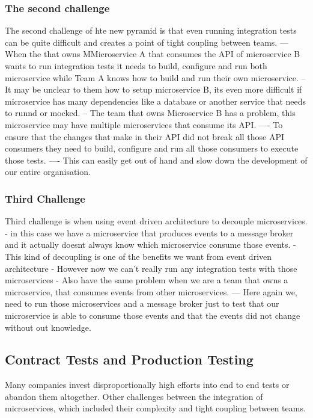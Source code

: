 \documentclass[a4paper, 11pt]{book}
\begin{document}
    \subsubsection{The second challenge}
    The second challenge of hte new pyramid is that even running integration tests can be quite difficult and creates a point of tight coupling between teams.
    --- When the that owns MMicroservice A that consumes the API of microservice B wants to run integration tests it needs to build, configure and run both microservice while Team A knows how to build and run their own microservice.
    -- It may be unclear to them how to setup microservice B, its even more difficult if microservice has many dependencies like a database or another service that needs to runnd or mocked.
    -- The team that owns Microservice B has a problem, this microservice may have multiple microservices that consume its API.
    ---- To ensure that the changes that make in their API did not break all those API consumers they need to build, configure and run all those consumers to execute those tests.
    ---- This can easily get out of hand and slow down the development of our entire organisation.

    \subsubsection{Third Challenge}
    Third challenge is when using event driven architecture to decouple microservices.
    - in this case we have a microservice that produces events to a message broker and it actually doesnt always know which microservice consume those events.
    - This kind of decoupling is one of the benefits we want from event driven architecture
    - However now we can't really run any integration tests with those microservices
    - Also have the same problem when we are a team that owns a microservice, that consumes events from other microservices.
    --- Here again we, need to run those microservices and a message broker just to test that our microservice is able to consume those events and that the events did not change without out knowledge.

    \subsection{Contract Tests and Production Testing}
    Many companies invest disproportionally high efforts into end to end tests or abandon them altogether.
    Other challenges between the integration of microservices, which included their complexity and tight coupling between teams.
\end{document}
